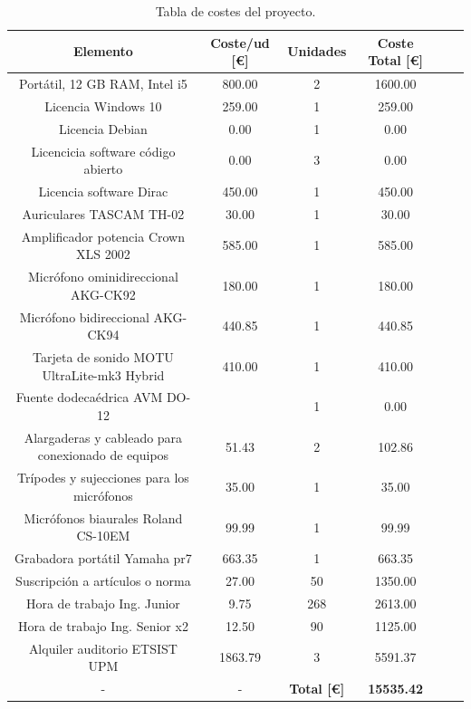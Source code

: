 \documentclass[11pt,a4paper]{book}
\begin{document}
        \begin{table}[H]
			\begin{center}
			\begin{scriptsize}
			\begin{tabular}{| c || c | c | c | c | c |}
				\hline
				\textbf{Elemento}&\textbf{Coste/ud [\euro]}&\textbf{Unidades}&\textbf{Coste Total [\euro]}\\ \hline
                Portátil, 12 GB RAM, Intel i5&800.00&2&1600.00\\ \hline
                Licencia Windows 10&259.00&1&259.00\\ \hline
                Licencia Debian&0.00&1&0.00\\ \hline
                Licencicia software código abierto&0.00&3&0.00\\ \hline
                Licencia software Dirac&450.00&1&450.00\\ \hline
                Auriculares TASCAM TH-02&30.00&1&30.00\\ \hline
                Amplificador potencia Crown XLS 2002&585.00&1&585.00\\ \hline
                Micrófono ominidireccional AKG-CK92&180.00&1&180.00\\ \hline
                Micrófono bidireccional AKG-CK94&440.85&1&440.85\\ \hline
                Tarjeta de sonido MOTU UltraLite-mk3 Hybrid&410.00&1&410.00\\ \hline
                Fuente dodecaédrica AVM DO-12&&1&0.00\\ \hline
                Alargaderas y cableado para conexionado de equipos&51.43&2&102.86\\ \hline
                Trípodes y sujecciones para los micrófonos&35.00&1&35.00\\ \hline
                Micrófonos biaurales Roland CS-10EM&99.99&1&99.99\\ \hline
                Grabadora portátil Yamaha pr7&663.35&1&663.35\\ \hline
                Suscripción a artículos o norma&27.00&50&1350.00\\ \hline
                Hora de trabajo Ing. Junior&9.75&268&2613.00\\ \hline
                Hora de trabajo Ing. Senior x2&12.50&90&1125.00\\ \hline
                Alquiler auditorio ETSIST UPM&1863.79&3&5591.37\\ \hline
                -&-&\textbf{Total [\euro]}&\textbf{15535.42}\\ \hline
        
            \end{tabular}
			\caption{Tabla de costes del proyecto.}
			\label{table:tablaPresupuesto}
			\end{scriptsize}
			\end{center}	
		\end{table}
\end{document}
